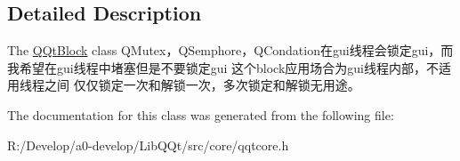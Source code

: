 \subsection{Detailed Description}
The \mbox{\hyperlink{class_q_qt_block}{Q\+Qt\+Block}} class Q\+Mutex，\+Q\+Semphore，\+Q\+Condation在gui线程会锁定gui，而我希望在gui线程中堵塞但是不要锁定gui 这个block应用场合为gui线程内部，不适用线程之间 仅仅锁定一次和解锁一次，多次锁定和解锁无用途。 

The documentation for this class was generated from the following file\+:\begin{DoxyCompactItemize}
\item 
R\+:/\+Develop/a0-\/develop/\+Lib\+Q\+Qt/src/core/qqtcore.\+h\end{DoxyCompactItemize}
